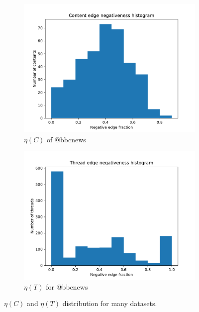 \begin{figure}
\begin{center}
\begin{subfigure}[b]{0.4\textwidth}
			\includegraphics[width=\textwidth]{tex/out/bbcnews500/neg-fraction-content-hist.pdf}
			\caption{$\eta(C)$ of @bbcnews}
			\label{fig:CNN-content-eta}
		\end{subfigure}
		\begin{subfigure}[b]{0.4\textwidth}
			\centering
			\includegraphics[width=\textwidth]{tex/out/bbcnews500/neg-fraction-thread-hist.pdf}
			\caption{$\eta(T)$ for @bbcnews}
			\label{fig:CNN-thread-eta}
		\end{subfigure}
		\caption{$\eta(C)$ and $\eta(T)$ distribution for many datasets.}
		\label{fig:eta-content-thread}
	\end{center}
\end{figure}

